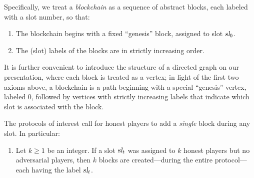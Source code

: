   Specifically, we treat a \emph{blockchain} as
  a sequence of abstract blocks, each labeled with a slot number, so
  that:
  \begin{enumerate}[label={\textbf{A\arabic*}}., ref={\textbf{A\arabic*}}, resume=axiom]
    \item\label{axiom:root} 
    The blockchain begins with a fixed ``genesis'' block, assigned to slot $\textsl{sl}_0$.
    
    \item\label{axiom:labels} 
    The (slot) labels of the blocks are in strictly increasing order.
  \end{enumerate}
  It is further convenient to introduce the structure of a directed
  graph on our presentation, where each block is treated as a vertex; in
  light of the first two axioms above, a blockchain is a path beginning
  with a special ``genesis'' vertex, labeled $0$, followed by vertices
  with strictly increasing labels that indicate which slot is associated
  with the block. %
  \begin{center}
  \end{center}
  The protocols of interest call for honest players to add a
  \emph{single} block %
  during any slot. In particular:
  \begin{enumerate}[label={\textbf{A\arabic*}}., ref={\textbf{A\arabic*}}, resume=axiom]
    \item\label{axiom:honest}
     Let $k \geq 1$ be an integer. 
    If a slot $\textsl{sl}_t$ was assigned to $k$ honest players but no adversarial players, 
    then $k$ blocks are created---during the entire protocol---each having the label $\textsl{sl}_t$.
  \end{enumerate}
